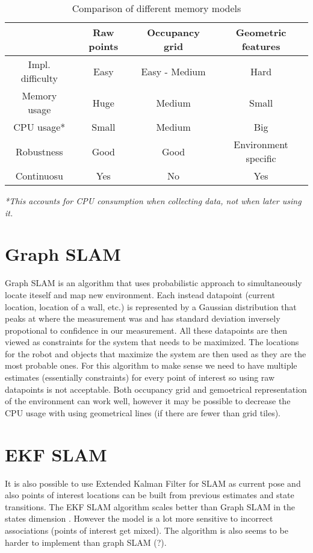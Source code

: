 \documentclass[12pt, a4paper, onecolumn]{article}
\begin{document}
\begin{table}[h!]
  \begin{center}
    \begin{tabular}[c]{|c | c c c|}
      \hline
       & Raw points & Occupancy grid & Geometric features \\
      \hline
      Impl. difficulty & Easy & Easy - Medium & Hard \\
      \hline
      Memory usage & Huge & Medium & Small \\
      \hline
      CPU usage* & Small & Medium & Big \\
      \hline
      Robustness & Good & Good & Environment specific \\
      \hline
      Continuosu & Yes & No & Yes \\
      \hline
    \end{tabular}
  \end{center}
  \caption{Comparison of different memory models}
  \label{tab:memory_models}
\end{table}
\textit{*This accounts for CPU consumption when collecting data, not when later using it.}

\section{Graph SLAM}
Graph SLAM is an algorithm that uses probabilistic approach to simultaneously locate iteself and map new environment.
Each instead datapoint (current location, location of a wall, etc.) is represented by a Gaussian distribution that peaks at where the measurement was
and has standard deviation inversely propotional to confidence in our measurement.
All these datapoints are then viewed as constraints for the system that needs to be maximized.
The locations for the robot and objects that maximize the system are then used as they are the most probable ones.
For this algorithm to make sense we need to have multiple estimates (essentially constraints) for every point of interest so using raw datapoints is not acceptable.
Both occupancy grid and gemoetrical representation of the environment can work well, however it may be possible to decrease the CPU usage with using geometrical lines (if there are fewer than grid tiles).

\section{EKF SLAM}
It is also possible to use Extended Kalman Filter for SLAM as current pose and also points of interest locations can be built from previous estimates and state transitions.
The EKF SLAM algorithm scales better than Graph SLAM in the states dimension \cite{EKFSLAM}. 
However the model is a lot more sensitive to incorrect associations (points of interest get mixed).
The algorithm is also seems to be harder to implement than graph SLAM (?). 
\end{document}

